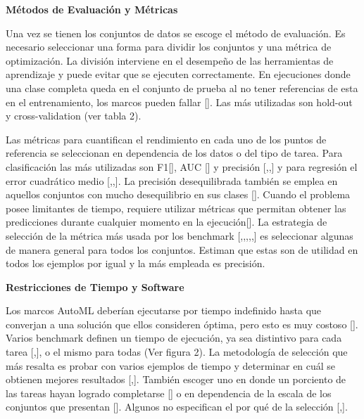 \begin{flushleft} 
    {\large { \textbf{Métodos de Evaluación y Métricas}}}\label{subsection:met_AutoML}
\end{flushleft}

Una vez se tienen los conjuntos de datos se escoge el método de evaluación. Es necesario seleccionar una forma para dividir los conjuntos y una métrica de optimización. 
La división interviene en el desempeño de las herramientas de aprendizaje y puede evitar que se ejecuten correctamente.
En ejecuciones donde una clase completa queda en el conjunto de prueba al no tener referencias de esta en el entrenamiento, los marcos pueden fallar [\cite{10}]. 
Las más utilizadas son hold-out y cross-validation (ver tabla 2).

Las métricas para cuantifican el rendimiento en cada uno de los puntos de referencia se seleccionan en dependencia de los datos o del tipo de tarea. Para clasificación 
las más utilizadas son F1[\cite{10}], AUC [\cite{15}] y precisión [\cite{16},\cite{19},\cite{24}] y para regresión el error cuadrático medio 
[\cite{10},\cite{16},\cite{19}]. La precisión desequilibrada también se emplea en aquellos conjuntos con mucho desequilibrio en sus clases [\cite{32}]. Cuando el 
problema posee limitantes de tiempo, requiere utilizar métricas que permitan obtener las predicciones durante cualquier momento en la ejecución[\cite{29}]. La 
estrategia de selección de la métrica más usada por los benchmark [\cite{8},\cite{9},\cite{13},\cite{20},\cite{22},\cite{26}] es seleccionar algunas de manera general 
para todos los conjuntos. Estiman que estas son de utilidad en todos los ejemplos por igual y la más empleada es precisión.

\begin{flushleft} 
    {\large { \textbf{Restricciones de Tiempo y Software}}}\label{subsection:tiempo_AutoML}
\end{flushleft}

Los marcos AutoML deberían ejecutarse por tiempo indefinido hasta que converjan a una solución que ellos consideren óptima, pero esto es muy costoso [\cite{16}]. 
Varios benchmark definen un tiempo de ejecución, ya sea distintivo para cada tarea [\cite{11},\cite{29}], o el mismo para todas (Ver figura 2). La metodología de 
selección que más resalta es probar con varios ejemplos de tiempo y determinar en cuál se obtienen mejores resultados [\cite{15},\cite{31}]. También escoger uno en 
donde un porciento de las tareas hayan logrado completarse [\cite{16}] o en dependencia de la escala de los conjuntos que presentan [\cite{23}]. Algunos no 
especifican el por qué de la selección [\cite{14},\cite{22}]. 

